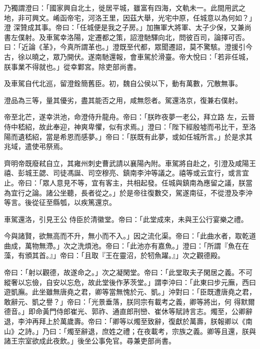 \begin{pinyinscope}
 乃獨謂澄曰：「國家興自北土，徙居平城，雖富有四海，文軌未一。此間用武之地，非可興文。崤函帝宅，河洛王里，因茲大舉，光宅中原，任城意以為何如？」澄
 深贊成其事。帝曰：「任城便是我之子房。」加撫軍大將軍、太子少保，又兼尚書左僕射。及車駕幸洛陽，定遷都之策，詔澄馳驛向北，問彼百司，論擇可否。曰：「近論《革》，今真所謂革也。」澄既至代都，眾聞遷詔，莫不驚駭。澄援引今古，徐以曉之，眾乃開伏。遂南馳還報，會車駕於滑臺。帝大悅曰：「若非任城，朕事業不得就也。」從幸鄴宮。除吏部尚書。



 及車駕自代北巡，留澄銓簡舊臣。初，魏自公侯以下，動有萬數，冗散無事。



 澄品為三等，量其優劣，盡其能否之用，咸無怨者。駕還洛京，復兼右僕射。



 帝至北芒，遂幸洪池，命澄侍升龍舟。帝曰：「朕昨夜夢一老公，拜立路
 左，云晉侍中嵇紹，故此奉迎，神爽卑懼，似有求焉。」澄曰：「陛下經殷墟而弔比干，至洛陽而遺嵇紹，當是希恩而感夢。」帝曰：「朕既有此夢，或如任城所言。」於是求其兆域，遣使弔祭焉。



 齊明帝既廢弒自立，其雍州刺史曹武請以襄陽內附。車駕將自赴之，引澄及咸陽王禧、彭城王勰、司徒馮誕、司空穆亮、鎮南李沖等議之。禧等或云宜行，或言宜止。帝曰：「眾人意見不等，宜有客主，共相起發。任城與鎮南為應留之議，朕當為宜行之論。諸公坐聽，長者從之。」於是帝往復數交，駕遂南征，不從澄及李沖等言。後從征至縣瓠，以疾篤還京。



 車駕還洛，引見王公
 侍臣於清徽堂。帝曰：「此堂成來，未與王公行宴樂之禮。



 今與諸賢，欲無高而不升，無小而不入。」因之流化渠。帝曰：「此曲水者，取乾道曲成，萬物無滯。」次之洗煩池。帝曰：「此池亦有嘉魚。」澄曰：「所謂『魚在在藻，有頒其首。』」帝曰：「且取『王在靈沼，於牣魚躍。』」次之觀德殿。



 帝曰：「射以觀德，故遂命之。」次之凝閑堂。帝曰：「此堂取夫子閑居之義。不可縱奢以忘儉，自安以忘危，故此堂後作茅茨堂。」謂李沖曰：「此東曰步元廡，西曰遊凱廡。此坐雖無唐堯之君，卿等當無愧於元、凱。」沖對曰：「臣既遭唐堯之君，敢辭元、凱之譽？」帝曰：「光景垂落，朕同宗有載考之義，卿等將出，何
 得默爾德音。」即命黃門侍郎崔光、郭祚、通直郎刑巒、崔休等賦詩言志。燭至，公卿辭退，李沖再拜上於萬歲壽。帝曰：「卿等以燭至致辭，復獻於萬壽，朕報卿以《南山》之詩。」乃曰：「燭至辭退，庶姓之禮；在夜載考，宗族之義。卿等且還，朕與諸王宗室欲成此夜飲。」後坐公事免官。尋兼吏部尚書。




\end{pinyinscope}
